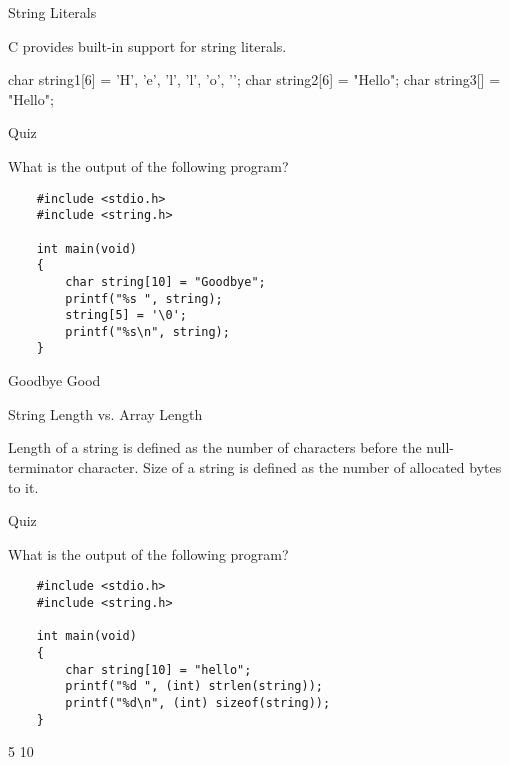 \documentclass[compress]{beamer}
\begin{document}
\begin{slide}
	\begin{block}{String Literals}

	C provides built-in support for string literals.

	\begin{terminal}
	char string1[6] = {'H', 'e', 'l', 'l', 'o', '\0'};
	char string2[6] = "Hello";
	char string3[] = "Hello";
	\end{terminal}

	\end{block}
\end{slide}

\begin{slide}
	\begin{block}{Quiz}

	What is the output of the following program?

	\begin{verbatim}
	#include <stdio.h>
	#include <string.h>
	
	int main(void)
	{
	    char string[10] = "Goodbye";
	    printf("%s ", string);
	    string[5] = '\0';
	    printf("%s\n", string);
	}
	\end{verbatim}

	\pause

	\begin{terminal}
	Goodbye Good
	\end{terminal}

	\end{block}
\end{slide}

\begin{slide}
	\begin{block}{String Length vs. Array Length}

	Length of a string is defined as the number of characters before the null-terminator character.
	Size of a string is defined as the number of allocated bytes to it.

	\end{block}
\end{slide}

\begin{slide}
	\begin{block}{Quiz}

	What is the output of the following program?

	\begin{verbatim}
	#include <stdio.h>
	#include <string.h>
	
	int main(void)
	{
	    char string[10] = "hello";
	    printf("%d ", (int) strlen(string));
	    printf("%d\n", (int) sizeof(string));
	}
	\end{verbatim}

	\pause

	\begin{terminal}
	5 10
	\end{terminal}

	\end{block}
\end{slide}
\end{document}
